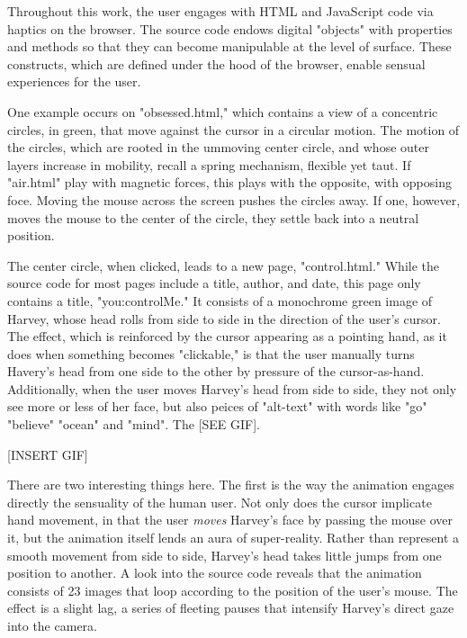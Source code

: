 \documentclass[11pt]{article}
\begin{document}
\begin{enumerate}
Throughout this work, the user engages with HTML and JavaScript code
via haptics on the browser. The source code endows digital "objects"
with properties and methods so that they can become manipulable at the
level of surface. These constructs, which are defined under the hood
of the browser, enable sensual experiences for the user. 

One example occurs on "obsessed.html," which contains a view of a
concentric circles, in green, that move against the cursor in a
circular motion. The motion of the circles, which are rooted in the
ummoving center circle, and whose outer layers increase in mobility,
recall a spring mechanism, flexible yet taut. If "air.html" play with
magnetic forces, this plays with the opposite, with opposing
foce. Moving the mouse across the screen pushes the circles away. If
one, however, moves the mouse to the center of the circle, they settle
back into a neutral position.

The center circle, when clicked, leads to a new page, "control.html."
While the source code for most pages include a title, author, and
date, this page only contains a title, "you:controlMe." It consists of
a monochrome green image of Harvey, whose head rolls from side to side
in the direction of the user's cursor. The effect, which is reinforced
by the cursor appearing as a pointing hand, as it does when something
becomes "clickable," is that the user manually turns Havery's head
from one side to the other by pressure of the
cursor-as-hand. Additionally, when the user moves Harvey's head from
side to side, they not only see more or less of her face, but also
peices of "alt-text" with words like "go" "believe" "ocean" and
"mind". The [SEE GIF].

[INSERT GIF]

There are two interesting things here. The first is the way the
animation engages directly the sensuality of the human user. Not only
does the cursor implicate hand movement, in that the user \emph{moves}
Harvey's face by passing the mouse over it, but the animation itself
lends an aura of super-reality. Rather than represent a smooth
movement from side to side, Harvey's head takes little jumps from one
position to another. A look into the source code reveals that the
animation consists of 23 images that loop according to the position of
the user's mouse. The effect is a slight lag, a series of fleeting
pauses that intensify Harvey's direct gaze into the camera.


\end{enumerate}
\end{document}
